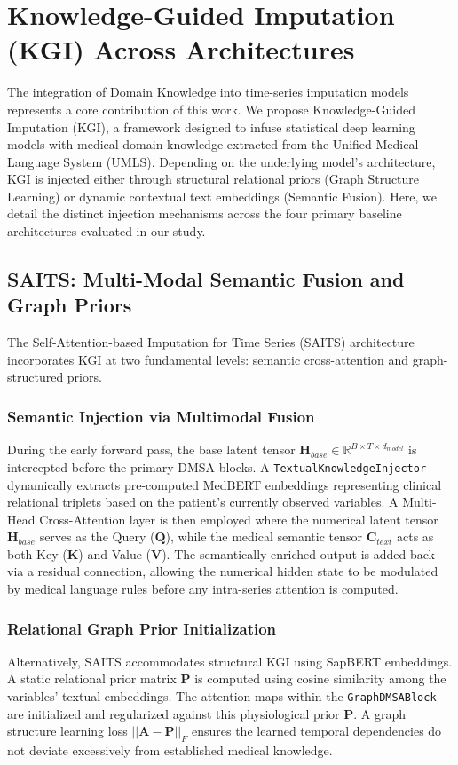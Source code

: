 \section{Knowledge-Guided Imputation (KGI) Across Architectures}

The integration of Domain Knowledge into time-series imputation models represents a core contribution of this work. We propose Knowledge-Guided Imputation (KGI), a framework designed to infuse statistical deep learning models with medical domain knowledge extracted from the Unified Medical Language System (UMLS). Depending on the underlying model's architecture, KGI is injected either through structural relational priors (Graph Structure Learning) or dynamic contextual text embeddings (Semantic Fusion). Here, we detail the distinct injection mechanisms across the four primary baseline architectures evaluated in our study.

\subsection{SAITS: Multi-Modal Semantic Fusion and Graph Priors}
The Self-Attention-based Imputation for Time Series (SAITS) architecture incorporates KGI at two fundamental levels: semantic cross-attention and graph-structured priors.

\subsubsection*{Semantic Injection via Multimodal Fusion}
During the early forward pass, the base latent tensor $\mathbf{H}_{base} \in \mathbb{R}^{B \times T \times d_{model}}$ is intercepted before the primary DMSA blocks. A \texttt{TextualKnowledgeInjector} dynamically extracts pre-computed MedBERT embeddings representing clinical relational triplets based on the patient's currently observed variables. A Multi-Head Cross-Attention layer is then employed where the numerical latent tensor $\mathbf{H}_{base}$ serves as the Query ($\mathbf{Q}$), while the medical semantic tensor $\mathbf{C}_{text}$ acts as both Key ($\mathbf{K}$) and Value ($\mathbf{V}$). The semantically enriched output is added back via a residual connection, allowing the numerical hidden state to be modulated by medical language rules before any intra-series attention is computed.

\subsubsection*{Relational Graph Prior Initialization}
Alternatively, SAITS accommodates structural KGI using SapBERT embeddings. A static relational prior matrix $\mathbf{P}$ is computed using cosine similarity among the variables' textual embeddings. The attention maps within the \texttt{GraphDMSABlock} are initialized and regularized against this physiological prior $\mathbf{P}$. A graph structure learning loss $||\mathbf{A} - \mathbf{P}||_F$ ensures the learned temporal dependencies do not deviate excessively from established medical knowledge.

